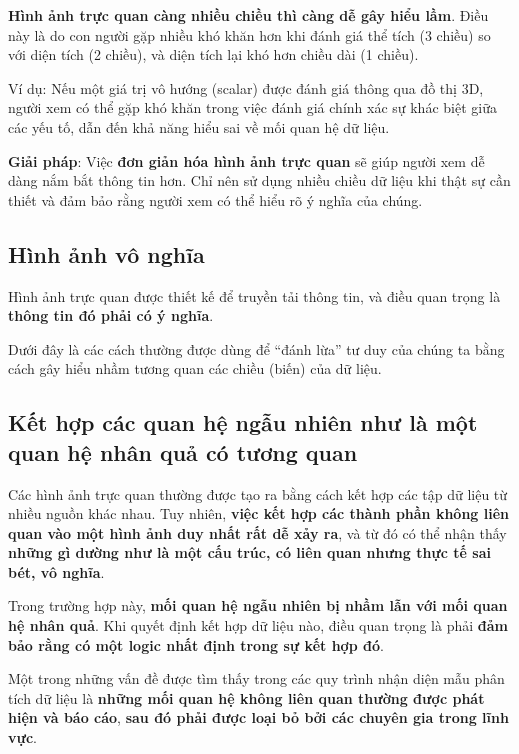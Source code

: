 \textbf{Hình ảnh trực quan càng nhiều chiều thì càng dễ gây hiểu lầm}.
Điều này là do con người gặp nhiều khó khăn hơn khi đánh giá thể tích (3
chiều) so với diện tích (2 chiều), và diện tích lại khó hơn chiều dài (1
chiều).

Ví dụ: Nếu một giá trị vô hướng (scalar) được đánh giá thông qua đồ thị
3D, người xem có thể gặp khó khăn trong việc đánh giá chính xác sự khác
biệt giữa các yếu tố, dẫn đến khả năng hiểu sai về mối quan hệ dữ liệu.

\textbf{Giải pháp}: Việc \textbf{đơn giản hóa hình ảnh trực quan} sẽ
giúp người xem dễ dàng nắm bắt thông tin hơn. Chỉ nên sử dụng nhiều
chiều dữ liệu khi thật sự cần thiết và đảm bảo rằng người xem có thể
hiểu rõ ý nghĩa của chúng.

\subsection{Hình ảnh vô nghĩa}\label{huxecnh-ux1ea3nh-vuxf4-nghux129a}

Hình ảnh trực quan được thiết kế để truyền tải thông tin, và điều quan
trọng là \textbf{thông tin đó phải có ý nghĩa}.

Dưới đây là các cách thường được dùng để ``đánh lừa'' tư duy của chúng
ta bằng cách gây hiểu nhầm tương quan các chiều (biến) của dữ liệu.

\subsection{Kết hợp các quan hệ ngẫu nhiên như là một quan hệ nhân quả
có tương
quan}\label{kux1ebft-hux1ee3p-cuxe1c-quan-hux1ec7-ngux1eabu-nhiuxean-nhux1b0-luxe0-mux1ed9t-quan-hux1ec7-nhuxe2n-quux1ea3-cuxf3-tux1b0ux1a1ng-quan}

Các hình ảnh trực quan thường được tạo ra bằng cách kết hợp các tập dữ
liệu từ nhiều nguồn khác nhau. Tuy nhiên, \textbf{việc kết hợp các thành
phần không liên quan vào một hình ảnh duy nhất rất dễ xảy ra}, và từ đó
có thể nhận thấy \textbf{những gì dường như là một cấu trúc, có liên
quan nhưng thực tế sai bét, vô nghĩa}.

Trong trường hợp này, \textbf{mối quan hệ ngẫu nhiên bị nhầm lẫn với mối
quan hệ nhân quả}. Khi quyết định kết hợp dữ liệu nào, điều quan trọng
là phải \textbf{đảm bảo rằng có một logic nhất định trong sự kết hợp
đó}.

Một trong những vấn đề được tìm thấy trong các quy trình nhận diện mẫu
phân tích dữ liệu là \textbf{những mối quan hệ không liên quan thường
được phát hiện và báo cáo}, \textbf{sau đó phải được loại bỏ bởi các
chuyên gia trong lĩnh vực}.

